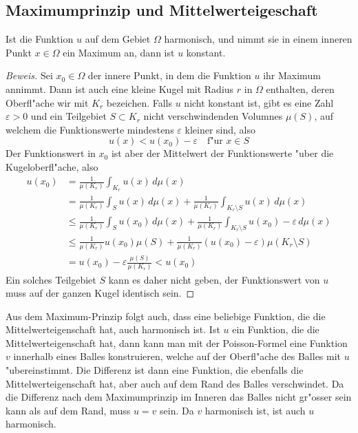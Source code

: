 \subsection{Maximumprinzip und Mittelwerteigeschaft}
\begin{satz}[Maximumprinzip]Ist die Funktion $u$ auf dem Gebiet
$\Omega$ harmonisch, und nimmt sie in einem inneren Punkt $x\in\Omega$
ein Maximum an, dann ist $u$ konstant.
\end{satz}

\begin{proof}[Beweis]
Sei $x_0\in\Omega$ der innere Punkt, in dem die Funktion $u$
ihr Maximum annimmt. Dann ist auch eine kleine Kugel mit Radius
$r$ in $\Omega$ enthalten, deren Oberfl"ache wir mit $K_r$
bezeichen. Falls $u$ nicht konstant ist, gibt
es eine Zahl $\varepsilon > 0$ und 
ein Teilgebiet $S\subset K_r$ nicht verschwindenden Volumnes $\mu(S)$,
auf welchem die Funktionswerte
mindestens $\varepsilon$ kleiner sind, also
\[
u(x)<u(x_0)-\varepsilon\quad\text{f"ur $x\in S$}
\]
Der Funktionswert in $x_0$ ist aber der Mittelwert der Funktionswerte
"uber die Kugeloberfl"ache, also
\begin{align*}
u(x_0)
&=
\frac1{\mu(K_r)}\int_{K_r}u(x)\,d\mu(x)
\\
&=\frac1{\mu(K_r)}\int_Su(x)\,d\mu(x)+\frac1{\mu(K_r)}\int_{K_r\setminus S}u(x)\,d\mu(x)
\\
&\le \frac1{\mu(K_r)}\int_S u(x_0)\,d\mu(x)+\frac1{\mu(K_r)}\int_{K_r\setminus S}u(x_0)-\varepsilon\,d\mu(x)
\\
&\le \frac1{\mu(K_r)}u(x_0)\mu(S)+\frac1{\mu(K_r)}(u(x_0)-\varepsilon)\mu(K_r\setminus S)
\\
&=
u(x_0)-\varepsilon\frac{\mu(S)}{\mu(K_r)}<u(x_0)
\end{align*}
Ein solches Teilgebiet $S$ kann es daher nicht geben, der Funktionswert
von $u$ muss auf der ganzen Kugel identisch sein.
\end{proof}

Aus dem Maximum-Prinzip folgt auch, dass eine beliebige Funktion, die
die Mittelwerteigenschaft hat, auch harmonisch ist. Ist $u$ ein
Funktion, die die Mittelwerteigenschaft hat, dann kann man mit der
Poisson-Formel eine Funktion $v$ innerhalb eines Balles konstruieren,
welche auf der Oberfl"ache des Balles mit $u$ "ubereinstimmt.
Die Differenz ist dann eine Funktion, die ebenfalls die Mittelwerteigenschaft
hat, aber auch auf dem Rand des Balles verschwindet. Da die Differenz
nach dem Maximumprinzip
im Inneren das Balles nicht gr"osser sein kann als auf dem Rand,
muss $u=v$ sein. Da $v$ harmonisch ist, ist auch $u$ harmonisch.


